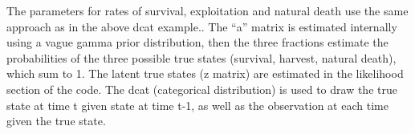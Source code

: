 \documentclass[
]{krantz}
\makeatletter
\newenvironment{Shaded}{\begin{snugshade}}{\end{snugshade}}
\newcommand{\AttributeTok}[1]{\textcolor[rgb]{0.27,0.27,0.27}{#1}}
\newcommand{\CommentTok}[1]{\textcolor[rgb]{0.37,0.37,0.37}{\textit{#1}}}
\newcommand{\ControlFlowTok}[1]{\textcolor[rgb]{0.27,0.27,0.27}{\textbf{#1}}}
\newcommand{\DecValTok}[1]{\textcolor[rgb]{0.06,0.06,0.06}{#1}}
\newcommand{\FunctionTok}[1]{\textcolor[rgb]{0.27,0.27,0.27}{\textbf{#1}}}
\newcommand{\NormalTok}[1]{#1}
\newcommand{\OtherTok}[1]{\textcolor[rgb]{0.37,0.37,0.37}{#1}}
\newcommand{\SpecialCharTok}[1]{\textcolor[rgb]{0.43,0.43,0.43}{\textbf{#1}}}
\newcommand{\StringTok}[1]{\textcolor[rgb]{0.5,0.5,0.5}{#1}}
\newenvironment{kframe}{%
\medskip{}
\setlength{\fboxsep}{.8em}
 \def\at@end@of@kframe{}%
 \ifinner\ifhmode%
  \def\at@end@of@kframe{\end{minipage}}%
  \begin{minipage}{\columnwidth}%
 \fi\fi%
 \def\FrameCommand##1{\hskip\@totalleftmargin \hskip-\fboxsep
 \colorbox{shadecolor}{##1}\hskip-\fboxsep
     \hskip-\linewidth \hskip-\@totalleftmargin \hskip\columnwidth}%
 \MakeFramed {\advance\hsize-\width
   \@totalleftmargin\z@ \linewidth\hsize
   \@setminipage}}%
 {\par\unskip\endMakeFramed%
 \at@end@of@kframe}
\renewenvironment{Shaded}{\begin{kframe}}{\end{kframe}}
\makeatother
\begin{document}
\begin{Shaded}
\end{Shaded}

The parameters for rates of survival, exploitation and natural death use the same approach as in the above dcat example.. The ``a'' matrix is estimated internally using a vague gamma prior distribution, then the three fractions estimate the probabilities of the three possible true states (survival, harvest, natural death), which sum to 1. The latent true states (z matrix) are estimated in the likelihood section of the code. The dcat (categorical distribution) is used to draw the true state at time t given state at time t-1, as well as the observation at each time given the true state.
\end{document}

